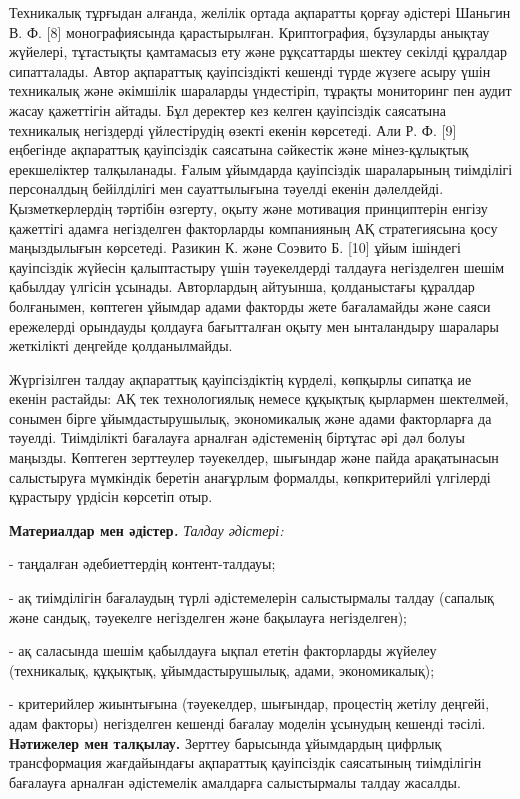 Техникалық тұрғыдан алғанда, желілік ортада ақпаратты қорғау әдістері
Шаньгин В. Ф. {[}8{]} монографиясында қарастырылған. Криптография,
бұзуларды анықтау жүйелері, тұтастықты қамтамасыз ету және рұқсаттарды
шектеу секілді құралдар сипатталады. Автор ақпараттық қауіпсіздікті
кешенді түрде жүзеге асыру үшін техникалық және әкімшілік шараларды
үндестіріп, тұрақты мониторинг пен аудит жасау қажеттігін айтады. Бұл
деректер кез келген қауіпсіздік саясатына техникалық негіздерді
үйлестірудің өзекті екенін көрсетеді. Али Р. Ф. {[}9{]} еңбегінде
ақпараттық қауіпсіздік саясатына сәйкестік және мінез-құлықтық
ерекшеліктер талқыланады. Ғалым ұйымдарда қауіпсіздік шараларының
тиімділігі персоналдың бейілділігі мен сауаттылығына тәуелді екенін
дәлелдейді. Қызметкерлердің тәртібін өзгерту, оқыту және мотивация
принциптерін енгізу қажеттігі адамға негізделген факторларды компанияның
АҚ стратегиясына қосу маңыздылығын көрсетеді. Разикин К. және Соэвито Б.
{[}10{]} ұйым ішіндегі қауіпсіздік жүйесін қалыптастыру үшін
тәуекелдерді талдауға негізделген шешім қабылдау үлгісін ұсынады.
Авторлардың айтуынша, қолданыстағы құралдар болғанымен, көптеген ұйымдар
адами факторды жете бағаламайды және саяси ережелерді орындауды қолдауға
бағытталған оқыту мен ынталандыру шаралары жеткілікті деңгейде
қолданылмайды.

Жүргізілген талдау ақпараттық қауіпсіздіктің күрделі, көпқырлы сипатқа
ие екенін растайды: АҚ тек технологиялық немесе құқықтық қырлармен
шектелмей, сонымен бірге ұйымдастырушылық, экономикалық және адами
факторларға да тәуелді. Тиімділікті бағалауға арналған әдістеменің
біртұтас әрі дәл болуы маңызды. Көптеген зерттеулер тәуекелдер, шығындар
және пайда арақатынасын салыстыруға мүмкіндік беретін анағұрлым
формалды, көпкритерийлі үлгілерді құрастыру үрдісін көрсетіп отыр.

{\bfseries Материалдар мен әдістер\emph{.}} \emph{Талдау әдістері:}


- таңдалған әдебиеттердің контент-талдауы;

- ақ тиімділігін бағалаудың түрлі әдістемелерін салыстырмалы талдау
(сапалық және сандық, тәуекелге негізделген және бақылауға
негізделген);

- ақ саласында шешім қабылдауға ықпал ететін факторларды жүйелеу
(техникалық, құқықтық, ұйымдастырушылық, адами, экономикалық);

- критерийлер жиынтығына (тәуекелдер, шығындар, процестің жетілу
деңгейі, адам факторы) негізделген кешенді бағалау моделін ұсынудың
кешенді тәсілі.
{\bfseries Нәтижелер мен талқылау.} Зерттеу барысында ұйымдардың цифрлық
трансформация жағдайындағы ақпараттық қауіпсіздік саясатының тиімділігін
бағалауға арналған әдістемелік амалдарға салыстырмалы талдау жасалды.

